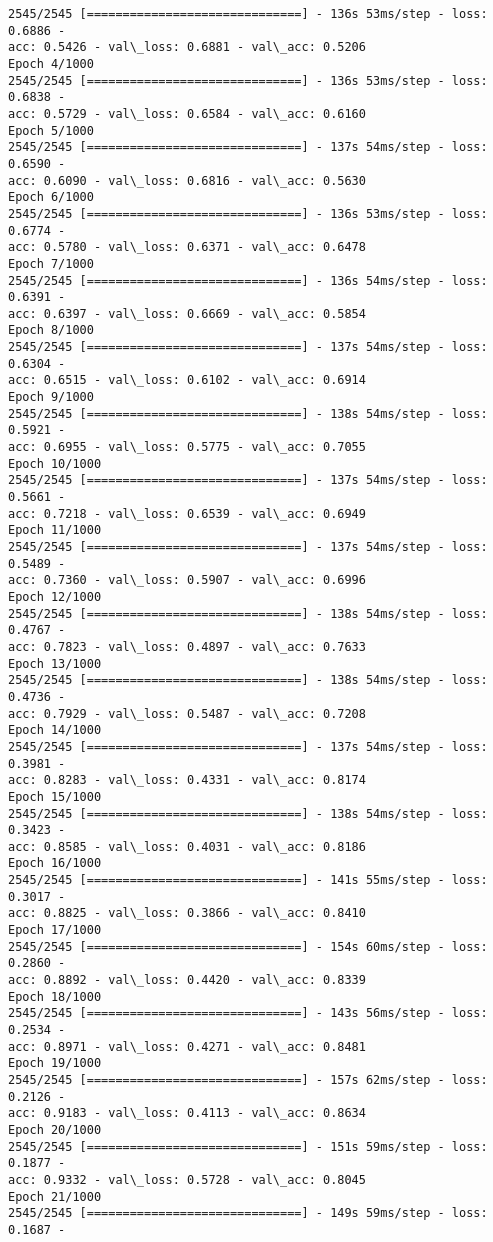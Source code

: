 \documentclass[11pt]{article}
\begin{document}
\begin{Verbatim}[commandchars=\\\{\}]
2545/2545 [==============================] - 136s 53ms/step - loss: 0.6886 -
acc: 0.5426 - val\_loss: 0.6881 - val\_acc: 0.5206
Epoch 4/1000
2545/2545 [==============================] - 136s 53ms/step - loss: 0.6838 -
acc: 0.5729 - val\_loss: 0.6584 - val\_acc: 0.6160
Epoch 5/1000
2545/2545 [==============================] - 137s 54ms/step - loss: 0.6590 -
acc: 0.6090 - val\_loss: 0.6816 - val\_acc: 0.5630
Epoch 6/1000
2545/2545 [==============================] - 136s 53ms/step - loss: 0.6774 -
acc: 0.5780 - val\_loss: 0.6371 - val\_acc: 0.6478
Epoch 7/1000
2545/2545 [==============================] - 136s 54ms/step - loss: 0.6391 -
acc: 0.6397 - val\_loss: 0.6669 - val\_acc: 0.5854
Epoch 8/1000
2545/2545 [==============================] - 137s 54ms/step - loss: 0.6304 -
acc: 0.6515 - val\_loss: 0.6102 - val\_acc: 0.6914
Epoch 9/1000
2545/2545 [==============================] - 138s 54ms/step - loss: 0.5921 -
acc: 0.6955 - val\_loss: 0.5775 - val\_acc: 0.7055
Epoch 10/1000
2545/2545 [==============================] - 137s 54ms/step - loss: 0.5661 -
acc: 0.7218 - val\_loss: 0.6539 - val\_acc: 0.6949
Epoch 11/1000
2545/2545 [==============================] - 137s 54ms/step - loss: 0.5489 -
acc: 0.7360 - val\_loss: 0.5907 - val\_acc: 0.6996
Epoch 12/1000
2545/2545 [==============================] - 138s 54ms/step - loss: 0.4767 -
acc: 0.7823 - val\_loss: 0.4897 - val\_acc: 0.7633
Epoch 13/1000
2545/2545 [==============================] - 138s 54ms/step - loss: 0.4736 -
acc: 0.7929 - val\_loss: 0.5487 - val\_acc: 0.7208
Epoch 14/1000
2545/2545 [==============================] - 137s 54ms/step - loss: 0.3981 -
acc: 0.8283 - val\_loss: 0.4331 - val\_acc: 0.8174
Epoch 15/1000
2545/2545 [==============================] - 138s 54ms/step - loss: 0.3423 -
acc: 0.8585 - val\_loss: 0.4031 - val\_acc: 0.8186
Epoch 16/1000
2545/2545 [==============================] - 141s 55ms/step - loss: 0.3017 -
acc: 0.8825 - val\_loss: 0.3866 - val\_acc: 0.8410
Epoch 17/1000
2545/2545 [==============================] - 154s 60ms/step - loss: 0.2860 -
acc: 0.8892 - val\_loss: 0.4420 - val\_acc: 0.8339
Epoch 18/1000
2545/2545 [==============================] - 143s 56ms/step - loss: 0.2534 -
acc: 0.8971 - val\_loss: 0.4271 - val\_acc: 0.8481
Epoch 19/1000
2545/2545 [==============================] - 157s 62ms/step - loss: 0.2126 -
acc: 0.9183 - val\_loss: 0.4113 - val\_acc: 0.8634
Epoch 20/1000
2545/2545 [==============================] - 151s 59ms/step - loss: 0.1877 -
acc: 0.9332 - val\_loss: 0.5728 - val\_acc: 0.8045
Epoch 21/1000
2545/2545 [==============================] - 149s 59ms/step - loss: 0.1687 -

\end{Verbatim}
\end{document}
